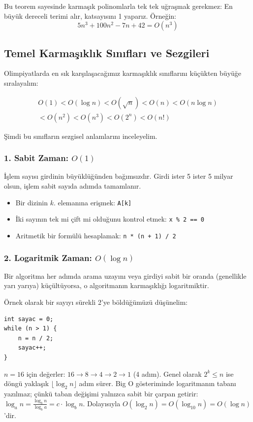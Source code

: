 Bu teorem sayesinde karmaşık polinomlarla tek tek uğraşmak gerekmez: En büyük dereceli terimi alır, katsayısını 1 yaparız. Örneğin:
\[ 5n^3 + 100n^2 - 7n + 42 = O(n^3) \]

\subsection{Temel Karmaşıklık Sınıfları ve Sezgileri}

Olimpiyatlarda en sık karşılaşacağımız karmaşıklık sınıflarını küçükten büyüğe sıralayalım:

\begin{multline*}
O(1) < O(\log n) < O(\sqrt{n}) < O(n) < O(n \log n) \\
< O(n^2) < O(n^3) < O(2^n) < O(n!)
\end{multline*}

Şimdi bu sınıfların sezgisel anlamlarını inceleyelim.

\subsubsection{1. Sabit Zaman: $O(1)$}
İşlem sayısı girdinin büyüklüğünden bağımsızdır. Girdi ister 5 ister 5 milyar olsun, işlem sabit sayıda adımda tamamlanır.
\begin{itemize}
    \item Bir dizinin $k$. elemanına erişmek: \texttt{A[k]}
    \item İki sayının tek mi çift mi olduğunu kontrol etmek: \texttt{x \% 2 == 0}
    \item Aritmetik bir formülü hesaplamak: \texttt{n * (n + 1) / 2}
\end{itemize}

\subsubsection{2. Logaritmik Zaman: $O(\log n)$}
Bir algoritma her adımda arama uzayını veya girdiyi sabit bir oranda (genellikle yarı yarıya) küçültüyorsa, o algoritmanın karmaşıklığı logaritmiktir. 

Örnek olarak bir sayıyı sürekli 2'ye böldüğümüzü düşünelim:
\begin{lstlisting}[language=CTemel]
int sayac = 0;
while (n > 1) {
    n = n / 2;
    sayac++;
}
\end{lstlisting}
$n = 16$ için değerler: $16 \to 8 \to 4 \to 2 \to 1$ (4 adım). 
Genel olarak $2^k \le n$ ise döngü yaklaşık $\lfloor \log_2 n \rfloor$ adım sürer. Big O gösteriminde logaritmanın tabanı yazılmaz; çünkü taban değişimi yalnızca sabit bir çarpan getirir: $\log_a n = \frac{\log_b n}{\log_b a} = c \cdot \log_b n$. Dolayısıyla $O(\log_2 n) = O(\log_{10} n) = O(\log n)$'dir.

